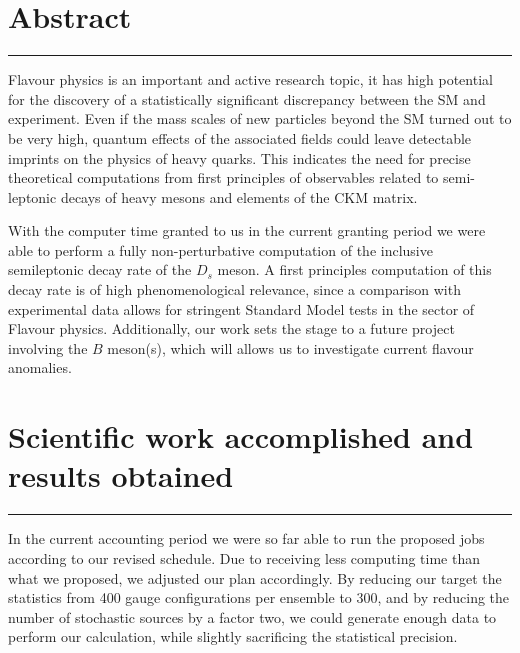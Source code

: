 \documentclass [a4paper, 11pt]{article}
\begin{document}
\newpage

\vfill
\tableofcontents
\vfill

\newpage

\section{Abstract}\label{sec:abstract}
\rule{\textwidth}{0.4pt}


Flavour physics is an important and active research topic, it has high potential
for the discovery of a statistically significant discrepancy between the SM and
experiment.
Even if the mass scales of new
particles beyond the SM turned out to be very high, quantum effects of
the associated fields could leave detectable imprints on the physics
of heavy quarks.
This indicates the need for precise theoretical computations from
first principles of observables related to semi-leptonic decays of
heavy mesons and elements of the CKM matrix. 

With the computer time granted to us in the current granting period we
were able to perform a fully non-perturbative computation of the inclusive semileptonic
decay rate of the $D_s$ meson.
A first principles computation of this decay rate is of high
phenomenological relevance, since a comparison with experimental data
allows for stringent Standard Model tests in the sector of Flavour physics.
Additionally, our work sets the stage to a future
project involving the $B$ meson(s), which will allows us to
investigate current flavour anomalies.



\section{Scientific work accomplished and results obtained}\label{sec:results}
\rule{\textwidth}{0.4pt}

In the current accounting period we were so far able to run the
proposed jobs according to our revised schedule. 
Due to receiving less computing time than what we proposed, we adjusted our plan
accordingly.
By reducing our target the statistics from 400 gauge
configurations per ensemble to 300, and by reducing the
number of stochastic sources by a factor two,
we could
generate enough data to perform our calculation, while slightly
sacrificing the statistical precision. 
\end{document}
